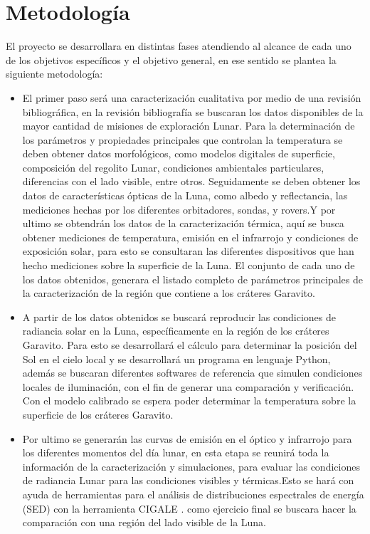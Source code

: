 \documentclass[12pt]{article}
\begin{document}
\section{Metodología}\label{sec:metodologia}
El proyecto se desarrollara en distintas fases atendiendo al alcance de cada uno de los 
objetivos específicos y el objetivo general, en ese sentido se plantea la siguiente metodología:
\begin{itemize}
    \item El primer paso será una caracterización cualitativa por medio de una 
    revisión bibliográfica, en la revisión bibliografía se buscaran los datos disponibles de
    la mayor cantidad de misiones de exploración Lunar. Para la determinación de los parámetros y propiedades 
    principales que controlan la temperatura se deben obtener datos morfológicos, como modelos digitales de 
    superficie, composición del regolito Lunar, condiciones ambientales particulares, diferencias con el lado visible, 
    entre otros. Seguidamente se deben obtener los datos de características ópticas de la Luna, como albedo y 
    reflectancia, las mediciones hechas por los diferentes orbitadores, sondas, y rovers.Y por ultimo se obtendrán 
    los datos de la caracterización térmica, aquí se busca obtener mediciones de temperatura, emisión en el infrarrojo y
    condiciones de exposición solar, para esto se consultaran las diferentes dispositivos que han hecho mediciones sobre 
    la superficie de la Luna. El conjunto de cada uno de los datos obtenidos, generara el listado completo de parámetros 
    principales de la caracterización de la región que contiene a los cráteres Garavito.
    \item A partir de los datos obtenidos se buscará reproducir las condiciones de radiancia solar en la Luna, específicamente 
    en la región de los cráteres Garavito. Para esto se desarrollará el cálculo para determinar la posición 
    del Sol en el cielo local y se desarrollará un programa en lenguaje Python, además se buscaran diferentes softwares 
    de referencia que simulen condiciones locales de iluminación, con el fin de generar una comparación y verificación. 
    Con el modelo calibrado se espera poder determinar la temperatura sobre la superficie de los cráteres Garavito.
    \item Por ultimo se generarán las curvas de emisión en el óptico y infrarrojo para los diferentes momentos del día 
    lunar, en esta etapa se reunirá toda la información de la caracterización y simulaciones, para evaluar las condiciones 
    de radiancia Lunar para las condiciones visibles y térmicas.Esto se hará con ayuda de herramientas para el análisis de distribuciones
    espectrales de energía (SED) con la herramienta CIGALE \parencite{Boquien2019}. como ejercicio final se buscara hacer 
    la comparación con una región del lado visible de la Luna.
\end{itemize}
\end{document}
